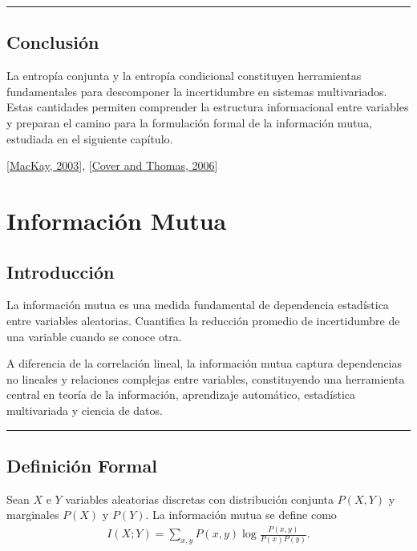 \documentclass[letterpaper,10pt,english]{jupyterBook}
\begin{document}
\bigskip\hrule\bigskip



\section{Conclusión}
\label{\detokenize{01_theory/conditional_entropy:conclusion}}
\sphinxAtStartPar
La entropía conjunta y la entropía condicional constituyen herramientas
fundamentales para descomponer la incertidumbre en sistemas multivariados.
Estas cantidades permiten comprender la estructura informacional entre
variables y preparan el camino para la formulación formal de la información
mutua, estudiada en el siguiente capítulo.

\sphinxAtStartPar
{[}\hyperlink{cite.05_appendices/references:id3}{MacKay, 2003}{]}, {[}\hyperlink{cite.05_appendices/references:id2}{Cover and Thomas, 2006}{]}

\sphinxstepscope


\chapter{Información Mutua}
\label{\detokenize{01_theory/mutual_information:informacion-mutua}}\label{\detokenize{01_theory/mutual_information::doc}}

\section{Introducción}
\label{\detokenize{01_theory/mutual_information:introduccion}}
\sphinxAtStartPar
La información mutua es una medida fundamental de dependencia estadística
entre variables aleatorias. Cuantifica la reducción promedio de incertidumbre
de una variable cuando se conoce otra.

\sphinxAtStartPar
A diferencia de la correlación lineal, la información mutua captura
dependencias no lineales y relaciones complejas entre variables,
constituyendo una herramienta central en teoría de la información,
aprendizaje automático, estadística multivariada y ciencia de datos.


\bigskip\hrule\bigskip



\section{Definición Formal}
\label{\detokenize{01_theory/mutual_information:definicion-formal}}
\sphinxAtStartPar
Sean \(X\) e \(Y\) variables aleatorias discretas con distribución conjunta
\(P(X,Y)\) y marginales \(P(X)\) y \(P(Y)\). La información mutua se define como
\begin{equation*}
\begin{split}
I(X;Y)=\sum_{x,y} P(x,y)\log\frac{P(x,y)}{P(x)P(y)}.
\end{split}
\end{equation*}
\end{document}
